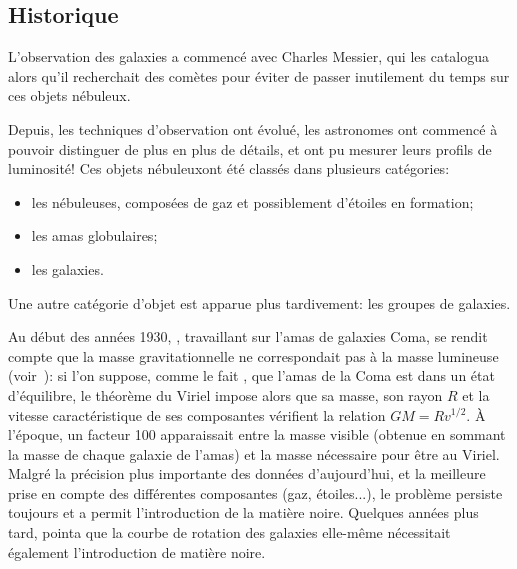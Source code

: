 		\subsection{Historique}

			L'observation des galaxies a commencé avec Charles Messier, qui les
			catalogua alors qu'il recherchait des comètes pour éviter de passer
			inutilement du temps sur ces objets \og nébuleux\fg{}.

			Depuis, les techniques d'observation ont évolué, les astronomes ont
			commencé à pouvoir distinguer de plus en plus de détails, et ont pu
			mesurer leurs profils de luminosité! Ces objets \og{}nébuleux\fg ont été classés dans
			plusieurs catégories:
			\begin{itemize}
				\item les nébuleuses, composées de gaz et possiblement d'étoiles en formation;
				\item les amas globulaires;
				\item les galaxies.
			\end{itemize}
			Une autre catégorie d'objet est apparue plus tardivement: les groupes de galaxies.

			Au début des années 1930, , travaillant sur l'amas de galaxies Coma, se rendit compte que la masse
			gravitationnelle ne correspondait pas à la masse lumineuse (voir~\cite{1933AcHPh...6..110Z}): si l'on suppose, comme le fait
			, que l'amas de la Coma est dans un état d'équilibre, le théorème du Viriel impose alors que sa masse, son rayon
			$R$ et la vitesse caractéristique de ses composantes vérifient la relation $GM = R v^{1/2}$. À l'époque, un facteur 100
			apparaissait entre la masse visible (obtenue en sommant la masse de chaque galaxie de l'amas) et la masse nécessaire pour être
			au Viriel. Malgré la précision plus importante des données d'aujourd'hui, et la meilleure prise en compte des différentes
			composantes (gaz, étoiles...), le problème persiste toujours et a permit l'introduction de la matière noire. Quelques années
			plus tard, \cite{1939LicOB..19...41B} pointa que la courbe de rotation des galaxies elle-même nécessitait également
			l'introduction de matière noire.


